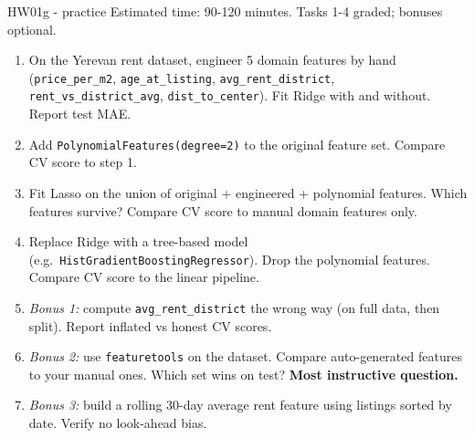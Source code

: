 \documentclass[aspectratio=169]{beamer}
\begin{document}
\begin{frame}{HW01g - practice}
  \footnotesize Estimated time: 90-120 minutes. Tasks 1-4 graded; bonuses optional.
  \begin{enumerate}\small
    \item On the Yerevan rent dataset, engineer 5 domain features by hand (\texttt{price\_per\_m2}, \texttt{age\_at\_listing}, \texttt{avg\_rent\_district}, \texttt{rent\_vs\_district\_avg}, \texttt{dist\_to\_center}). Fit Ridge with and without. Report test MAE.
    \item Add \texttt{PolynomialFeatures(degree=2)} to the original feature set. Compare CV score to step 1.
    \item Fit Lasso on the union of original + engineered + polynomial features. Which features survive? Compare CV score to manual domain features only.
    \item Replace Ridge with a tree-based model (e.g.\ \texttt{HistGradientBoostingRegressor}). Drop the polynomial features. Compare CV score to the linear pipeline.
    \item \emph{Bonus 1:} compute \texttt{avg\_rent\_district} the wrong way (on full data, then split). Report inflated vs honest CV scores.
    \item \emph{Bonus 2:} use \texttt{featuretools} on the dataset. Compare auto-generated features to your manual ones. Which set wins on test? \textbf{Most instructive question.}
    \item \emph{Bonus 3:} build a rolling 30-day average rent feature using listings sorted by date. Verify no look-ahead bias.
  \end{enumerate}
\end{frame}
\end{document}
